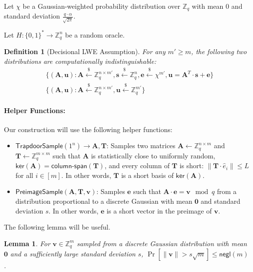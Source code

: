\documentclass[11pt]{article}
\newtheorem{definition}[theorem]{Definition}
\newtheorem{lemma}[theorem]{Lemma}
\numberwithin{equation}{section}
\newcommand{\bfe}{\mathbf{e}}
\newcommand{\bfs}{\mathbf{s}}
\newcommand{\bfu}{\mathbf{u}}
\newcommand{\bfv}{\mathbf{v}}
\newcommand{\bfA}{\mathbf{A}}
\newcommand{\bfT}{\mathbf{T}}
\newcommand{\bbZ}{\mathbb{Z}}
\newcommand{\negl}{\mathsf{negl}}
\newcommand{\getsr}{\stackrel{\$}{\gets}}
\newcommand{\bin}{\{0,1\}}
\newcommand{\bit}{\bin}
\begin{document}
Let $\chi$ be a Gaussian-weighted probability distribution over $\bbZ_q$ with mean $0$ and standard deviation $\frac{q \cdot \alpha}{\sqrt{2 \pi}}$.

Let $H:\bit^* \to \bbZ_q^n$ be a random oracle. 

\begin{definition}[Decisional LWE Assumption]\label{def:decisional-LWE-assumption}
    For any $m' \geq m$, the following two distributions are computationally indistinguishable:
    \begin{align*}
        &\{(\bfA, \bfu) : \bfA \getsr \bbZ_q^{n \times m'}, \bfs \getsr \bbZ_q^{n}, \bfe \getsr \chi^{m'}, \bfu = \bfA^T \cdot \bfs + \bfe\}\\
        &\{(\bfA, \bfu) : \bfA \getsr \bbZ_q^{n \times m'}, \bfu \getsr \bbZ_q^{m'}\}
    \end{align*}
\end{definition}

\paragraph{Helper Functions:} Our construction will use the following helper functions:
\begin{itemize}
    \item $\mathsf{TrapdoorSample}(1^n) \to \bfA, \bfT$: Samples two matrices $\bfA \gets \bbZ_q^{n \times m}$ and $\bfT \gets \bbZ_q^{m \times m}$ such that $\bfA$ is statistically close to uniformly random, $\mathsf{ker}(\bfA) = \mathsf{column\text{-}span}(\bfT)$, and every column of $\bfT$ is short: $\|\bfT \cdot \hat{e}_i\| \leq L$ for all $i \in [m]$. In other words, $\bfT$ is a short basis of $\mathsf{ker}(\bfA)$.
    \item $\mathsf{PreimageSample}(\bfA, \bfT, \bfv)$: Samples $\bfe$ such that $\bfA \cdot \bfe = \bfv \mod q$ from a distribution proportional to a discrete Gaussian with mean $\mathbf{0}$ and standard deviation $s$. In other words, $\bfe$ is a short vector in the preimage of $\bfv$.
\end{itemize}

The following lemma will be useful.
\begin{lemma}\label{thm:gaussians-produce-small-values}
For $\bfv \in \bbZ_q^m$ sampled from a discrete Gaussian distribution with mean $\mathbf{0}$ and a sufficiently large standard deviation $s$, $\Pr[\|\bfv\| > s \sqrt{m}] \leq \negl(m)$.
\end{lemma}
\end{document}
